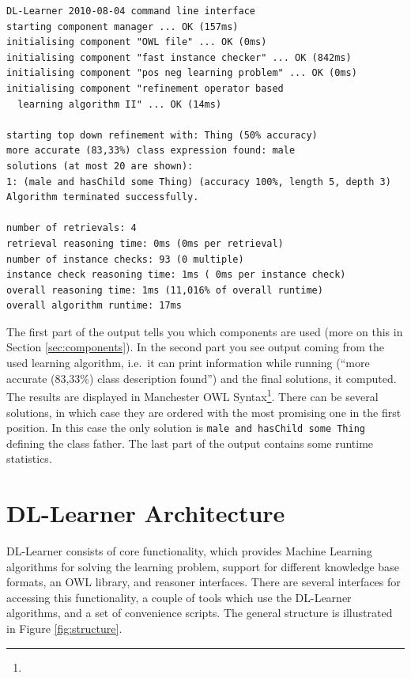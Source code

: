 \documentclass[a4paper,12pt]{scrartcl}
\begin{document}
\begin{verbatim}
DL-Learner 2010-08-04 command line interface
starting component manager ... OK (157ms)
initialising component "OWL file" ... OK (0ms)
initialising component "fast instance checker" ... OK (842ms)
initialising component "pos neg learning problem" ... OK (0ms)
initialising component "refinement operator based 
  learning algorithm II" ... OK (14ms)

starting top down refinement with: Thing (50% accuracy)
more accurate (83,33%) class expression found: male
solutions (at most 20 are shown):
1: (male and hasChild some Thing) (accuracy 100%, length 5, depth 3)
Algorithm terminated successfully.

number of retrievals: 4
retrieval reasoning time: 0ms (0ms per retrieval)
number of instance checks: 93 (0 multiple)
instance check reasoning time: 1ms ( 0ms per instance check)
overall reasoning time: 1ms (11,016% of overall runtime)
overall algorithm runtime: 17ms
\end{verbatim}

The first part of the output tells you which components are used (more on this in Section \ref{sec:components}). In the second part you see output coming from the used learning algorithm, i.e.~it can print information while running (``more accurate (83,33\%) class description found'') and the final solutions, it computed. The results are displayed in Manchester OWL Syntax\footnote{\mos}. There can be several solutions, in which case they are ordered with the most promising one in the first position. In this case the only solution is \verb|male and hasChild some Thing| defining the class father. The last part of the output contains some runtime statistics.

\section{DL-Learner Architecture}

DL-Learner consists of core functionality, which provides Machine Learning algorithms for solving the learning problem, support for different knowledge base formats, an OWL library, and reasoner interfaces. There are several interfaces for accessing this functionality, a couple of tools which use the DL-Learner algorithms, and a set of convenience scripts. The general structure is illustrated in Figure \ref{fig:structure}.
\end{document}
